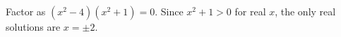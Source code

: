 Factor as $(x^2-4)(x^2+1)=0$. Since $x^2+1>0$ for real $x$, the only real solutions are $\boxed{x=\pm2}$.
